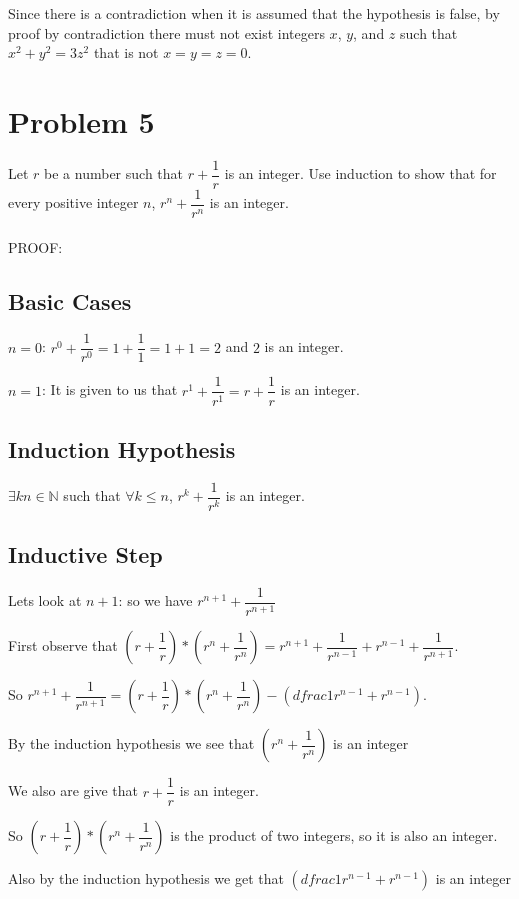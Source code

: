\documentclass[letterpaper, 11pt]{article}
\begin{document}
Since there is a contradiction when it is assumed that the hypothesis is false, by proof by contradiction there must not exist integers $x$, $y$, and $z$ such that $x^2 + y^2 = 3z^2$ that is not $x = y = z = 0$.
\newpage
\section{Problem 5}
Let $r$ be a number such that $r + \dfrac{1}{r}$ is an integer. Use induction to show that for every positive integer $n$, $r^n + \dfrac{1}{r^n}$ is an integer.\\\\
PROOF:\\
\subsection*{Basic Cases}

$n = 0$: $r^0 + \dfrac{1}{r^0} = 1 + \dfrac{1}{1} = 1 + 1 = 2$ and $2$ is an integer.

$n = 1$: It is given to us that $r^1 + \dfrac{1}{r^1} = r + \dfrac{1}{r}$ is an integer.

\subsection*{Induction Hypothesis}
$\exists kn \in \mathbb{N}$ such that $\forall k \leq n$, $r^k + \dfrac{1}{r^k}$ is an integer. 

\subsection*{Inductive Step}
Lets look at $n + 1$: so we have $r^{n+1} + \dfrac{1}{r^{n+1}}$

First observe that $(r + \dfrac{1}{r}) * (r^n + \dfrac{1}{r^n}) = r^{n+1} + \dfrac{1}{r^{n-1}} + r^{n-1} + \dfrac{1}{r^{n+1}}$.

So $r^{n+1} + \dfrac{1}{r^{n+1}} = (r + \dfrac{1}{r}) * (r^n + \dfrac{1}{r^n}) - (dfrac{1}{r^{n-1}} + r^{n-1})$.

By the induction hypothesis we see that $(r^n + \dfrac{1}{r^n})$ is an integer

We also are give that $r + \dfrac{1}{r}$ is an integer.

So $(r + \dfrac{1}{r}) * (r^n + \dfrac{1}{r^n})$ is the product of two integers, so it is also an integer.

Also by the induction hypothesis we get that $(dfrac{1}{r^{n-1}} + r^{n-1})$ is an integer
\end{document}
